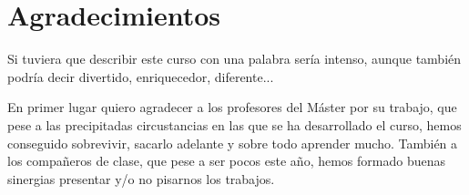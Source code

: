\chapter{Agradecimientos}\label{ch:Agradecimientos}

Si tuviera que describir este curso con una palabra sería intenso, aunque también podría decir divertido, enriquecedor, diferente...

En primer lugar quiero agradecer a los profesores del Máster por su trabajo, que pese a las precipitadas circustancias en las que se ha desarrollado el curso, hemos conseguido 
sobrevivir, sacarlo adelante y sobre todo aprender mucho. También a los compañeros de clase, que pese a ser pocos este año, hemos formado buenas sinergias presentar y/o no 
pisarnos los trabajos. 
